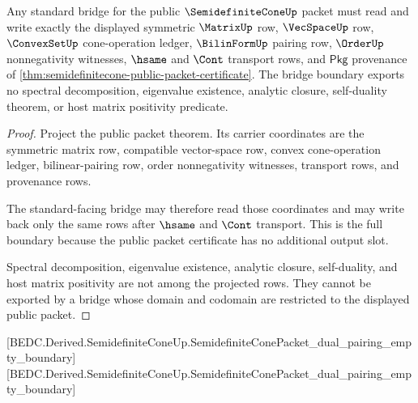 \begin{theorem}
\label{thm:semidefinitecone-standard-bridge-boundary}
Any standard bridge for the public $\SemidefiniteConeUp$ packet must read and
write exactly the displayed symmetric $\MatrixUp$ row, $\VecSpaceUp$ row,
$\ConvexSetUp$ cone-operation ledger, $\BilinFormUp$ pairing row, $\OrderUp$
nonnegativity witnesses, $\hsame$ and $\Cont$ transport rows, and $\mathsf{Pkg}$
provenance of \autoref{thm:semidefinitecone-public-packet-certificate}. The
bridge boundary exports no spectral decomposition, eigenvalue existence,
analytic closure, self-duality theorem, or host matrix positivity predicate.
\end{theorem}
\begin{proof}
Project the public packet theorem. Its carrier coordinates are the symmetric
matrix row, compatible vector-space row, convex cone-operation ledger,
bilinear-pairing row, order nonnegativity witnesses, transport rows, and
provenance rows.

The standard-facing bridge may therefore read those coordinates and may write
back only the same rows after $\hsame$ and $\Cont$ transport. This is the full
boundary because the public packet certificate has no additional output slot.

Spectral decomposition, eigenvalue existence, analytic closure, self-duality,
and host matrix positivity are not among the projected rows. They cannot be
exported by a bridge whose domain and codomain are restricted to the displayed
public packet.
\end{proof}

[BEDC.Derived.SemidefiniteConeUp.SemidefiniteConePacket\_dual\_pairing\_empty\_boundary]
[BEDC.Derived.SemidefiniteConeUp.SemidefiniteConePacket\_dual\_pairing\_empty\_boundary]

